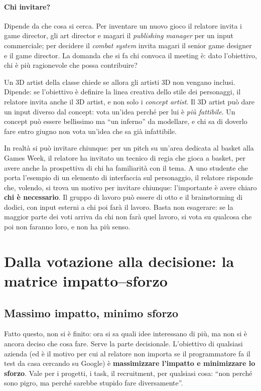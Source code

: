 \paragraph{Chi invitare?} Dipende da che cosa si cerca. Per inventare un nuovo gioco il
relatore invita i game director, gli art director e magari il \emph{publishing manager}
per un input commerciale; per decidere il \emph{combat system} invita magari il senior
game designer e il game director. La domanda che si fa chi convoca il meeting è: dato
l'obiettivo, chi è più ragionevole che possa contribuire?

Un 3D artist della classe chiede se allora gli artisti 3D non vengano inclusi. Dipende:
se l'obiettivo è definire la linea creativa dello stile dei personaggi, il relatore
invita anche il 3D artist, e non solo i \emph{concept artist}. Il 3D artist può dare un
input diverso dal concept: vota un'idea perché per lui è \emph{più fattibile}. Un
concept può essere bellissimo ma ``un inferno'' da modellare, e chi sa di doverlo fare
entro giugno non vota un'idea che sa già infattibile.

In realtà si può invitare chiunque: per un pitch su un'area dedicata al basket alla
Games Week, il relatore ha invitato un tecnico di regia che gioca a basket, per avere
anche la prospettiva di chi ha familiarità con il tema. A uno studente che porta
l'esempio di un elemento di interfaccia sul personaggio, il relatore risponde che,
volendo, si trova un motivo per invitare chiunque: l'importante è avere chiaro
\textbf{chi è necessario}. Il gruppo di lavoro può essere di otto e il brainstorming di
dodici, con input esterni a chi poi farà il lavoro. Basta non esagerare: se la maggior
parte dei voti arriva da chi non farà quel lavoro, si vota su qualcosa che poi non
faranno loro, e non ha più senso.

\section{Dalla votazione alla decisione: la matrice impatto--sforzo}
\label{sec:z2-impatto}

\subsection{Massimo impatto, minimo sforzo}

Fatto questo, non si è finito: ora si sa quali idee interessano di più, ma non si è
ancora deciso che cosa fare. Serve la parte decisionale. L'obiettivo di qualsiasi
azienda (ed è il motivo per cui al relatore non importa se il programmatore fa il test
da casa cercando su Google) è \textbf{massimizzare l'impatto e minimizzare lo sforzo}.
Vale per i progetti, i task, il recruitment, per qualsiasi cosa: ``non perché sono
pigro, ma perché sarebbe stupido fare diversamente''.

